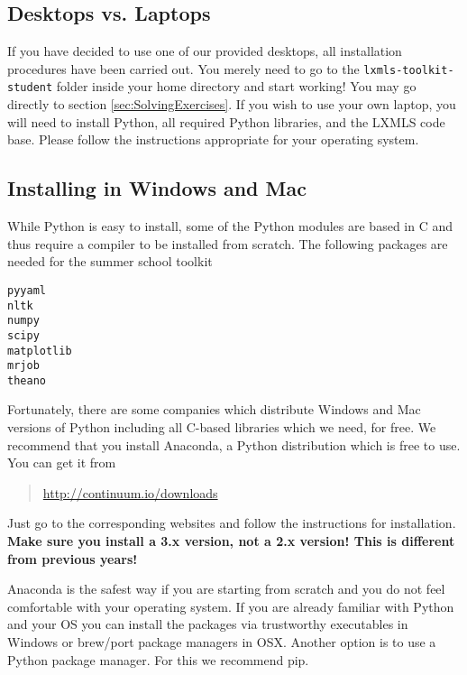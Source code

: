 \subsection{Desktops vs. Laptops}

If you have decided to use one of our provided desktops, all installation
procedures have been carried out. You merely need to go to the
\verb+lxmls-toolkit-student+ folder inside your home directory and start
working! You may go directly to section \ref{sec:SolvingExercises}.  If you
wish to use your own laptop, you will need to install Python, all
required Python libraries, and the LXMLS code base. Please follow the
instructions appropriate for your operating system.

\subsection{Installing in Windows and Mac}

While Python is easy to install, some of the Python modules are based in C and
thus require a compiler to be installed from scratch. The following packages
are needed for the summer school toolkit 

\begin{verbatim}
pyyaml
nltk
numpy
scipy
matplotlib
mrjob
theano 
\end{verbatim}

Fortunately, there are some companies which distribute Windows and Mac versions
of Python including all C-based libraries which we need, for free. We recommend
that you install Anaconda, a Python distribution which is free to use. You can
get it from 

\begin{quotation}
\url{http://continuum.io/downloads}
\end{quotation}

%
Just go to the corresponding websites and follow the instructions for
installation.
    \textbf{Make sure you install a 3.x version, not a 2.x version! This is different from previous years!}

Anaconda is the safest way if you are starting from scratch and you do not
feel comfortable with your operating system. If you are already familiar with
Python and your OS you can install the packages via trustworthy executables 
in Windows or brew/port package managers in OSX. Another option is to use 
a Python package manager. For this we recommend pip.  

